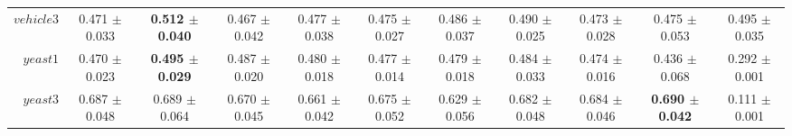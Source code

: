 \begin{table}[!ht]
{\begin{tabular}{r c c c c c c c c c c}
$vehicle3$ & 0.471 $\pm$ 0.033 & \textbf{0.512 $\pm$ 0.040} & 0.467 $\pm$ 0.042 & 0.477 $\pm$ 0.038 & 0.475 $\pm$ 0.027 & 0.486 $\pm$ 0.037 & 0.490 $\pm$ 0.025 & 0.473 $\pm$ 0.028 & 0.475 $\pm$ 0.053 & 0.495 $\pm$ 0.035 \\
$yeast1$ & 0.470 $\pm$ 0.023 & \textbf{0.495 $\pm$ 0.029} & 0.487 $\pm$ 0.020 & 0.480 $\pm$ 0.018 & 0.477 $\pm$ 0.014 & 0.479 $\pm$ 0.018 & 0.484 $\pm$ 0.033 & 0.474 $\pm$ 0.016 & 0.436 $\pm$ 0.068 & 0.292 $\pm$ 0.001 \\
$yeast3$ & 0.687 $\pm$ 0.048 & 0.689 $\pm$ 0.064 & 0.670 $\pm$ 0.045 & 0.661 $\pm$ 0.042 & 0.675 $\pm$ 0.052 & 0.629 $\pm$ 0.056 & 0.682 $\pm$ 0.048 & 0.684 $\pm$ 0.046 & \textbf{0.690 $\pm$ 0.042} & 0.111 $\pm$ 0.001 \\
\end{tabular}}
\end{table}
